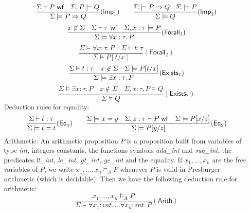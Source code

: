 \documentclass[a4paper,12pt]{report}
\begin{document}
\begin{displaymath}
  \frac{\Sigma\vdash P~\mathsf{wf} \quad \Sigma,P\models Q}
       {\Sigma\models P\Rightarrow Q}(\mathsf{Imp}_1)
  \qquad
  \frac{\Sigma\models P\Rightarrow Q \quad \Sigma\models P}
       {\Sigma\models Q}(\mathsf{Imp}_2)
\end{displaymath}
\begin{displaymath}
  \frac{x\not\in\Sigma \quad
        \Sigma\vdash\tau~\mathsf{wf} \quad 
        \Sigma,x:\tau\models P}
       {\Sigma\models\forall x:\tau.\,P}(\mathsf{Forall}_1)
\end{displaymath}
\begin{displaymath}
  \frac{\Sigma\models\forall x:\tau.\,P \quad
        \Sigma\vdash t:\tau}
       {\Sigma\models P[t/x]}(\mathsf{Forall}_2)
\end{displaymath}
\begin{displaymath}
  \frac{%
        \Sigma\vdash t:\tau \quad
        x\not\in\Sigma \quad
        \Sigma\models P[t/x]}
       {\Sigma\models\exists x:\tau.\,P}(\mathsf{Exists}_1)
\end{displaymath}
\begin{displaymath}
  \frac{\Sigma\models\exists x:\tau.\,P \quad
        x\not\in\Sigma \quad
        \Sigma,x:\tau,P\models Q}
       {\Sigma\models Q}(\mathsf{Exists}_2)
\end{displaymath}
Deduction rules for equality: 
\begin{displaymath}
  \frac{\Sigma\vdash t:\tau}
       {\Sigma\models t=t}(\mathsf{Eq}_1)
  \qquad
  \frac{\Sigma\models x=y \quad
        \Sigma,z:\tau\vdash P~\mathsf{wf} \quad 
        \Sigma\models P[x/z]}
       {\Sigma\models P[y/z]}(\mathsf{Eq}_2)
\end{displaymath}
Arithmetic:
An arithmetic proposition $P$ is a proposition built from 
variables of type \textit{int}, integers constants,
the functions symbols \textit{add\_int} and \textit{sub\_int}, the predicates
\textit{lt\_int, le\_int, gt\_int, ge\_int} and the equality.
If $x_1,\dots,x_n$ are the free variables of $P$,
we write $x_1,\dots,x_n\models_A P$ whenever $P$ is valid in
Presburger arithmetic (which is decidable).
Then we have the following deduction rule for arithmetic:
\begin{displaymath}
  \frac{x_1,\dots,x_n\models_A P}
       {\Sigma\models\forall x_1:\mathit{int}.\,\dots\forall
         x_n:\mathit{int}.\, P}(\mathsf{Arith})
\end{displaymath}
\end{document}
